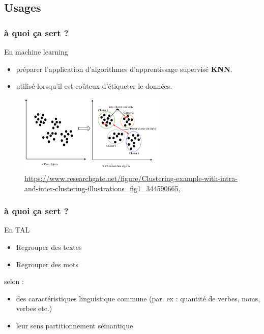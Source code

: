 \subsection{Usages}
\begin{frame}
  \frametitle{ à quoi ça sert ?}
  En machine learning
  \begin{itemize}
  \item {} préparer l’application d’algorithmes d’apprentissage supervisé  \textbf{KNN}.\\
\item {} utilisé lorsqu’il est coûteux d’étiqueter le données.
\end{itemize}

 \begin{figure}
  \includegraphics[width=7cm]{images/Clustering-example-with-intra-and-inter-clustering-illustrations.png}
  \caption{\url{https://www.researchgate.net/figure/Clustering-example-with-intra-and-inter-clustering-illustrations_fig1_344590665}, \cite{10.1007/s00521-020-05395-4}}
  \end{figure}
  
\end{frame}

\begin{frame}
  \frametitle{à quoi ça sert ?}
  En TAL
 \begin{itemize}
  \item {} Regrouper des textes
  \item {} Regrouper des mots 
  \end{itemize}
  
   selon :
  \begin{itemize}
  \item {} des caractéristiques linguistique commune (par. ex : quantité de verbes, noms, verbes etc.)
  \item {} leur sens  partitionnement sémantique
  \end{itemize}

\end{frame}


